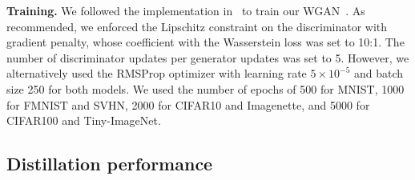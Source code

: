 \begin{foldable}
  \textbf{Training.} We followed the implementation in~\cite{gulrajani2017improved} to train our WGAN~\cite{arjovsky2017wasserstein}.
  As recommended, we enforced the Lipschitz constraint on the discriminator with gradient penalty, whose coefficient with the Wasserstein loss was set to 10:1.
  The number of discriminator updates per generator updates was set to 5.
  However, we alternatively used the RMSProp optimizer with learning rate $5 \times 10^{-5}$ and batch size 250 for both models.
  We used the number of epochs of 500 for MNIST, 1000 for FMNIST and SVHN, 2000 for CIFAR10 and Imagenette, and 5000 for CIFAR100 and Tiny-ImageNet.
\end{foldable}

\subsection{Distillation performance}

